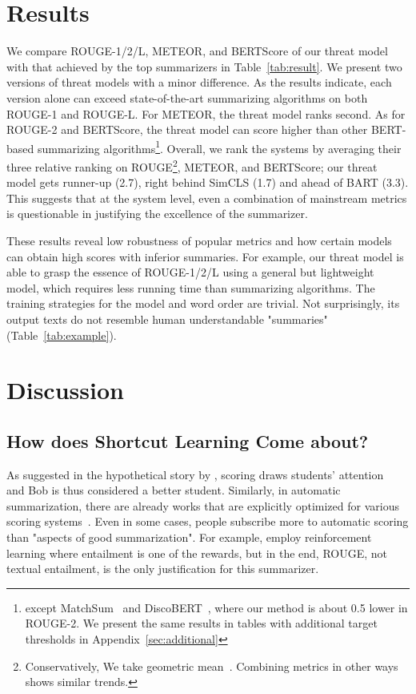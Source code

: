 \documentclass[11pt]{article}
\theoremstyle{remark}
\begin{document}
\section{Results}
We compare ROUGE-1/2/L, METEOR, and BERTScore of our threat model with that achieved by the top summarizers in Table~\ref{tab:result}. We present two versions of threat models with a minor difference. As the results indicate, each version alone can exceed state-of-the-art summarizing algorithms on both ROUGE-1 and ROUGE-L. For METEOR, the threat model ranks second. As for ROUGE-2 and BERTScore, the threat model can score higher than other BERT-based summarizing algorithms\footnote{except MatchSum~\cite{zhong-etal-2020-extractive} and DiscoBERT~\cite{xu-etal-2020-discourse}, where our method is about 0.5 lower in ROUGE-2. We present the same results in tables with additional target thresholds in Appendix~\ref{sec:additional}}. Overall, we rank the systems by averaging their three relative ranking on ROUGE\footnote{Conservatively, We take geometric mean~\cite{chowdhery2022palm}. Combining metrics in other ways shows similar trends.}, METEOR, and BERTScore; our threat model gets runner-up (2.7), right behind SimCLS (1.7) and ahead of BART (3.3). This suggests that at the system level, even a combination of mainstream metrics is questionable in justifying the excellence of the summarizer.


These results reveal low robustness of popular metrics and how certain models can obtain high scores with inferior summaries. For example, our threat model is able to grasp the essence of ROUGE-1/2/L using a general but lightweight model, which requires less running time than summarizing algorithms. The training strategies for the model and word order are trivial. Not surprisingly, its output texts do not resemble human understandable "summaries" (Table~\ref{tab:example}).


\section{Discussion}

\subsection{How does Shortcut Learning Come about?}
As suggested in the hypothetical story by \citeauthor{geirhos2020shortcut}, scoring draws students’ attention~\cite{filighera2022cheating} and Bob is thus considered a better student. Similarly, in automatic summarization, there are already works that are explicitly optimized for various scoring systems~\cite{jauregi-unanue-etal-2021-berttune,pasunuru-bansal-2018-multi}. Even in some cases, people subscribe more to automatic scoring than "aspects of good summarization". For example, \citet{pasunuru-bansal-2018-multi} employ reinforcement learning where entailment is one of the rewards, but in the end, ROUGE, not textual entailment, is the only justification for this summarizer.
\end{document}
